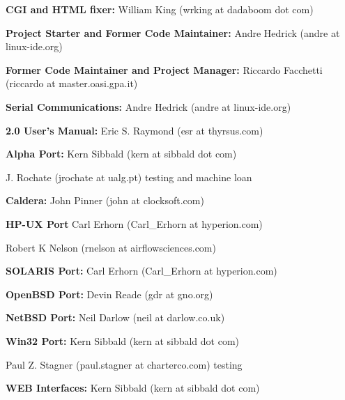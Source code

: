 {{{{{{{{{{{{{{{{{\begin{description}
\item {\bf CGI and HTML fixer:}
William King (wrking at dadaboom dot com)  

\item {\bf Project Starter and Former Code Maintainer:}
Andre Hedrick (andre at linux-ide.org)  

\item {\bf Former Code Maintainer and Project Manager:}
Riccardo Facchetti (riccardo at master.oasi.gpa.it)  

\item {\bf Serial Communications:}
Andre Hedrick (andre at linux-ide.org)  

\item {\bf 2.0 User's Manual:}
Eric S. Raymond (esr at thyrsus.com)  

\item {\bf Alpha Port:}
Kern Sibbald (kern at sibbald dot com)  

J. Rochate (jrochate at ualg.pt) testing and machine loan  

\item {\bf Caldera:}
John Pinner (john at clocksoft.com)  

\item {\bf HP-UX Port}
Carl Erhorn (Carl\_Erhorn at hyperion.com)  

Robert K Nelson (rnelson at airflowsciences.com)  

\item {\bf SOLARIS Port:}
Carl Erhorn (Carl\_Erhorn at hyperion.com)  

\item {\bf OpenBSD Port:}
Devin Reade (gdr at gno.org)  

\item {\bf NetBSD Port:}
Neil Darlow (neil at darlow.co.uk)  

\item {\bf Win32 Port:}
Kern Sibbald (kern at sibbald dot com)  

Paul Z. Stagner (paul.stagner at charterco.com) testing  

\item {\bf WEB Interfaces:}
Kern Sibbald (kern at sibbald dot com)  


\end{description}}}}}}}}}}}}}}}}}}
